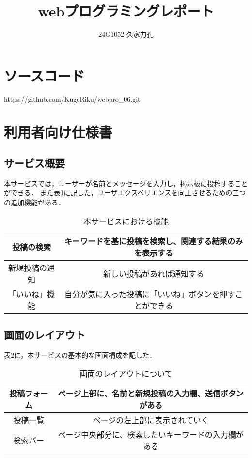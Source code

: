 \documentclass[uplatex,dvipdfmx]{jsarticle}
\begin{document}
\title{webプログラミングレポート}
\author{24G1052 久家力孔}
\maketitle
\section{ソースコード}
https://github.com/KugeRiku/webpro\_06.git

\section{利用者向け仕様書}

\subsection{サービス概要}
本サービスでは，ユーザーが名前とメッセージを入力し，掲示板に投稿することができる．
また表1に記した，ユーザエクスペリエンスを向上させるための三つの追加機能がある．

\begin{table}[ht]
    \centering
    \caption{本サービスにおける機能}
    \begin{tabular}{|c|c|}
        \hline
        投稿の検索 & キーワードを基に投稿を検索し、関連する結果のみを表示する \\ \hline
        新規投稿の通知 &  新しい投稿があれば通知する \\ \hline
        「いいね」機能 & 自分が気に入った投稿に「いいね」ボタンを押すことができる \\ \hline
    
    \end{tabular}
\end{table}

\subsection{画面のレイアウト}
表2に，本サービスの基本的な画面構成を記した．

\begin{table}[ht]
    \centering
    \caption{画面のレイアウトについて}
    \begin{tabular}{|c|c|}
        \hline
        投稿フォーム & ページ上部に、名前と新規投稿の入力欄、送信ボタンがある \\ \hline
        投稿一覧 &  ページの左上部に表示されていく \\ \hline
        検索バー & ページ中央部分に、検索したいキーワードの入力欄がある \\ \hline
    
    \end{tabular}
\end{table}
\end{document}
